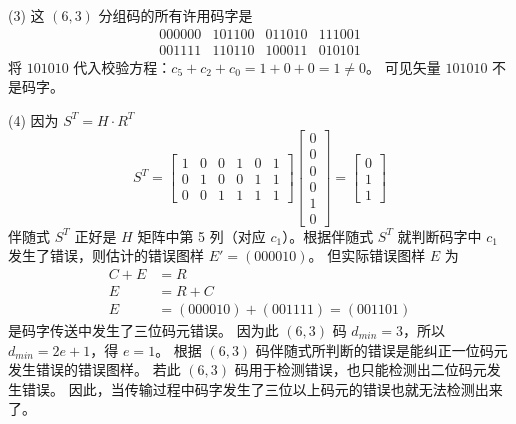 \documentclass[11pt, a4paper]{article}
\begin{document}
(3) 这 $(6, 3)$ 分组码的所有许用码字是
\[
\begin{matrix}
000000 & 101100 & 011010 & 111001 \\
001111 & 110110 & 100011 & 010101
\end{matrix}
\]
将 $101010$ 代入校验方程：$c_5+c_2+c_0 = 1+0+0 = 1 \neq 0$。
可见矢量 $101010$ 不是码字。

(4) 因为 $S^T = H \cdot R^T$
\[
S^T = \begin{bmatrix}
1 & 0 & 0 & 1 & 0 & 1 \\
0 & 1 & 0 & 0 & 1 & 1 \\
0 & 0 & 1 & 1 & 1 & 1
\end{bmatrix}
\begin{bmatrix}
0 \\ 0 \\ 0 \\ 0 \\ 1 \\ 0
\end{bmatrix}
= \begin{bmatrix}
0 \\ 1 \\ 1
\end{bmatrix}
\]
伴随式 $S^T$ 正好是 $H$ 矩阵中第 5 列（对应 $c_1$）。根据伴随式 $S^T$ 就判断码字中 $c_1$ 发生了错误，则估计的错误图样 $E'=(000010)$。
但实际错误图样 $E$ 为
\[
\begin{aligned}
C + E &= R \\
E &= R + C \\
E &= (000010) + (001111) = (001101)
\end{aligned}
\]
是码字传送中发生了三位码元错误。
因为此 $(6, 3)$ 码 $d_{min}=3$，所以 $d_{min} = 2e + 1$，得 $e=1$。
根据 $(6, 3)$ 码伴随式所判断的错误是能纠正一位码元发生错误的错误图样。
若此 $(6, 3)$ 码用于检测错误，也只能检测出二位码元发生错误。
因此，当传输过程中码字发生了三位以上码元的错误也就无法检测出来了。
\end{document}
